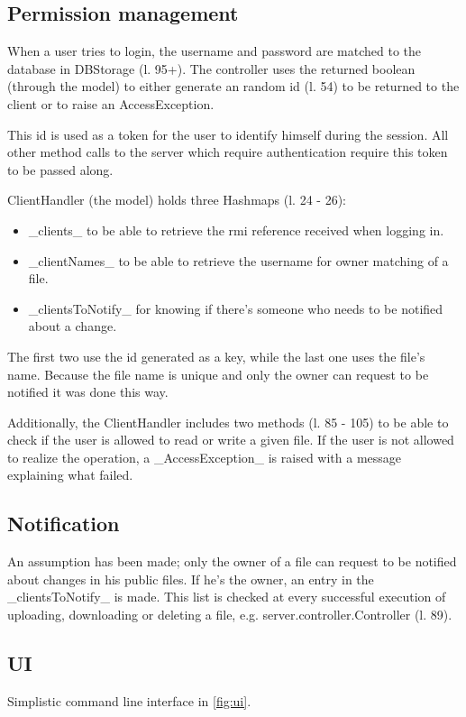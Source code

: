 \documentclass[a4paper]{scrartcl}
\begin{document}
\subsection{Permission management}
When a user tries to login, the username and password are matched to the database in DBStorage (l. 95+).
The controller uses the returned boolean (through the model) to either generate an random id (l. 54) to be returned to the client or to raise an AccessException.


This id is used as a token for the user to identify himself during the session.
All other method calls to the server which require authentication require this token to be passed along.

ClientHandler (the model) holds three Hashmaps (l. 24 - 26):
\begin{itemize}
    \item _clients_ to be able to retrieve the rmi reference received when logging in.
    \item _clientNames_ to be able to retrieve the username for owner matching of a file.
    \item _clientsToNotify_ for knowing if there's someone who needs to be notified about a change.
\end{itemize}
The first two use the id generated as a key, while the last one uses  the file's name.
Because the file name is unique and only the owner can request to be notified it was done this way.


Additionally, the ClientHandler includes two methods (l. 85 - 105) to be able to check if the user is allowed to read or write a given file.
If the user is not allowed to realize the operation, a _AccessException_ is raised with a message explaining what failed.

\subsection{Notification}

An assumption has been made; only the owner of a file can request to be notified about changes in his public files.
If he's the owner, an entry in the _clientsToNotify_ is made. This list is checked at every successful execution of uploading, downloading or deleting a file, e.g. server.controller.Controller (l. 89).

\subsection{UI}
Simplistic command line interface in \ref{fig:ui}.
\end{document}
